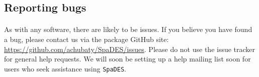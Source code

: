 \documentclass{article}
\begin{document}
\subsection{Reporting bugs}

\paragraph{}
As with any software, there are likely to be issues. If you believe you have found a bug, please contact us via the package GitHub site: \url{https://github.com/achubaty/SpaDES/issues}. Please do not use the issue tracker for general help requests. We will soon be setting up a help mailing list soon for users who seek assistance using \texttt{SpaDES}.
\end{document}
